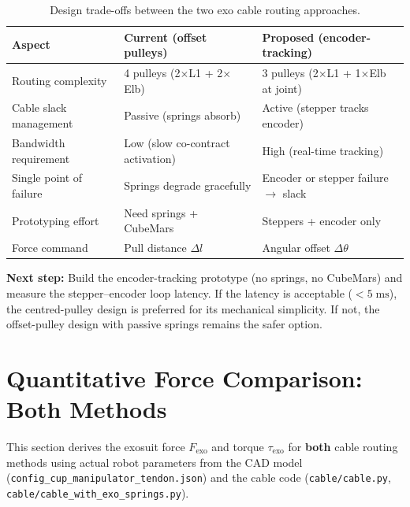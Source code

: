 \documentclass[11pt, a4paper]{article}
\begin{document}
\begin{table}[h]
\centering
\begin{tabular}{@{}lll@{}}
\toprule
\textbf{Aspect}
    & \textbf{Current (offset pulleys)}
    & \textbf{Proposed (encoder-tracking)} \\
\midrule
Routing complexity
    & 4 pulleys (2$\times$L1 + 2$\times$Elb)
    & 3 pulleys (2$\times$L1 + 1$\times$Elb at joint) \\
Cable slack management
    & Passive (springs absorb)
    & Active (stepper tracks encoder) \\
Bandwidth requirement
    & Low (slow co-contract activation)
    & High (real-time tracking) \\
Single point of failure
    & Springs degrade gracefully
    & Encoder or stepper failure $\to$ slack \\
Prototyping effort
    & Need springs + CubeMars
    & Steppers + encoder only \\
Force command
    & Pull distance $\Delta l$
    & Angular offset $\Delta\theta$ \\
\bottomrule
\end{tabular}
\caption{Design trade-offs between the two exo cable routing approaches.}
\label{tab:tradeoff}
\end{table}

\begin{mdframed}
\textbf{Next step:} Build the encoder-tracking prototype (no springs, no
CubeMars) and measure the stepper--encoder loop latency.  If the latency is
acceptable ($<5\;\text{ms}$), the centred-pulley design is preferred for its
mechanical simplicity.  If not, the offset-pulley design with passive springs
remains the safer option.
\end{mdframed}

\newpage
\section{Quantitative Force Comparison: Both Methods}
\label{sec:force-comparison}

This section derives the exosuit force $F_{\text{exo}}$ and torque
$\tau_{\text{exo}}$ for \textbf{both} cable routing methods using actual
robot parameters from the CAD model
(\texttt{config\_cup\_manipulator\_tendon.json}) and the cable code
(\texttt{cable/cable.py}, \texttt{cable/cable\_with\_exo\_springs.py}).
\end{document}
